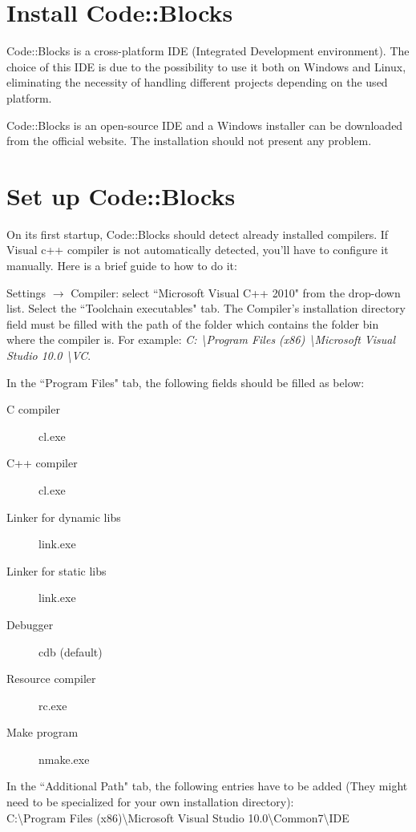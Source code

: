 \documentclass[12pt,a4paper]{report}
\begin{document}
\section*{Install Code::Blocks}
Code::Blocks is a cross-platform IDE (Integrated Development environment). The choice of this IDE is due to the possibility to use it both on Windows and Linux, eliminating the necessity of handling different projects depending on the used platform.

Code::Blocks is an open-source IDE and a Windows installer can be downloaded from the official website. The installation should not present any problem.

\section*{Set up Code::Blocks}
On its first startup, Code::Blocks should detect already installed compilers. If Visual c++ compiler is not automatically detected, you'll have to configure it manually. Here is a brief guide to how to do it:

Settings $\to$ Compiler: select ``Microsoft Visual C++ 2010" from the drop-down list.
Select the ``Toolchain executables" tab. The Compiler's installation directory field must be filled with the path of the folder which contains the folder bin where the compiler is. For example: \emph{C: \textbackslash Program Files (x86) \textbackslash Microsoft Visual Studio 10.0 \textbackslash VC}.

In the ``Program Files" tab, the following fields should be filled as below:
\begin{description}
\item[C compiler] cl.exe
\item[C++ compiler] cl.exe
\item[Linker for dynamic libs] link.exe
\item[Linker for static libs] link.exe
\item[Debugger] cdb (default)
\item[Resource compiler] rc.exe
\item[Make program] nmake.exe
\end{description}

In the ``Additional Path" tab, the following entries have to be added (They might need to be specialized for your own installation directory):\\

C:\textbackslash Program Files (x86)\textbackslash Microsoft Visual Studio 10.0\textbackslash Common7\textbackslash IDE
\end{document}
